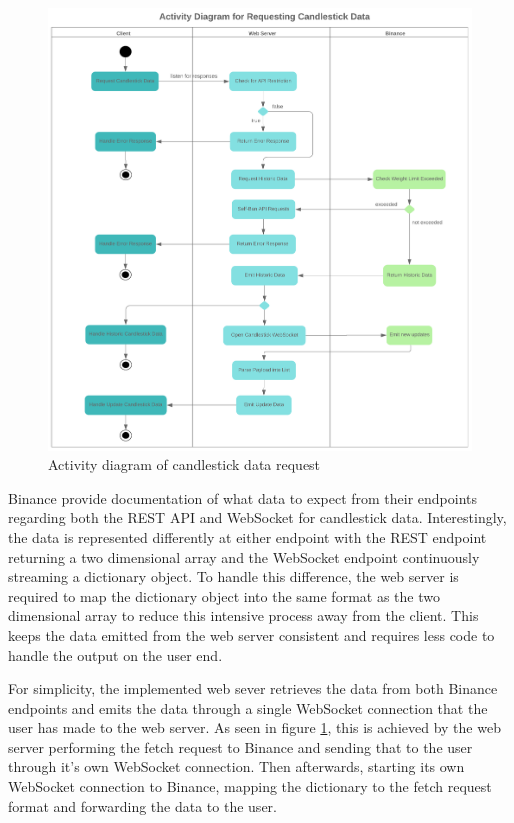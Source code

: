 \begin{figure}[!htb]
    \centering
	\includegraphics[width=\textwidth]{content/graphics/diagrams/AD_KLINE.png}
	\caption{Activity diagram of candlestick data request}
    
	\label{fig:implementation:AD_KLINE}
\end{figure}

Binance provide documentation of what data to expect from their endpoints regarding both the REST API and WebSocket for candlestick data. Interestingly, the data is represented differently at either endpoint with the REST endpoint returning a two dimensional array and the WebSocket endpoint continuously streaming a dictionary object. To handle this difference, the web server is required to map the dictionary object into the same format as the two dimensional array to reduce this intensive process away from the client. This keeps the data emitted from the web server consistent and requires less code to handle the output on the user end.%

For simplicity, the implemented web sever retrieves the data from both Binance endpoints and emits the data through a single WebSocket connection that the user has made to the web server. As seen in figure \ref{fig:implementation:AD_KLINE}, this is achieved by the web server performing the fetch request to Binance and sending that to the user through it's own WebSocket connection. Then afterwards, starting its own WebSocket connection to Binance, mapping the dictionary to the fetch request format and forwarding the data to the user. 

